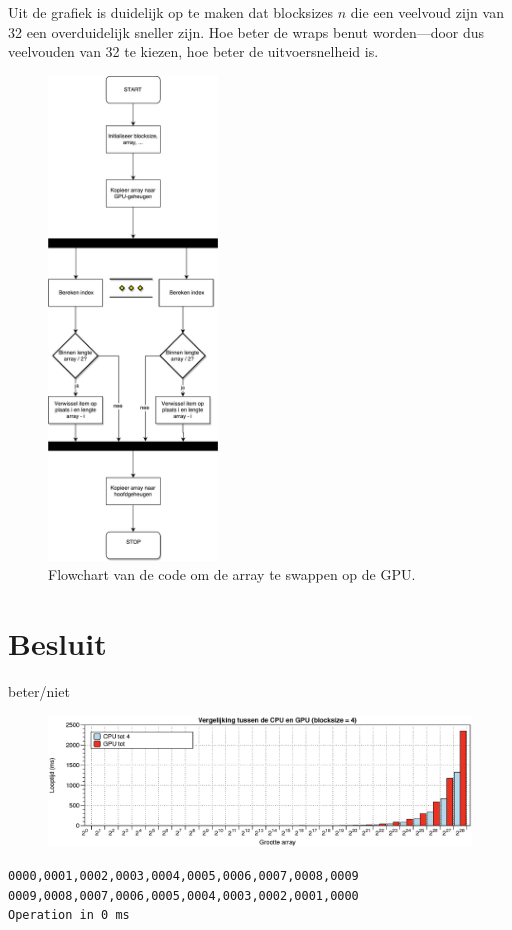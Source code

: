 \documentclass[10pt, twocolumn, a4paper]{article}
\begin{document}
Uit de grafiek is duidelijk op te maken dat blocksizes $n$ die een veelvoud zijn van 32 een overduidelijk sneller zijn. Hoe beter de wraps benut worden---door dus veelvouden van 32 te kiezen, hoe beter de uitvoersnelheid is.

\begin{figure}
\centering
\includegraphics[width=0.4\textwidth]{flowgraph.pdf}
\caption{Flowchart van de code om de array te swappen op de GPU.}
\end{figure}

\section{Besluit}
beter/niet

\begin{figure}
\includegraphics[width=\textwidth]{comp_4.eps}
\end{figure}



\begin{verbatim}
0000,0001,0002,0003,0004,0005,0006,0007,0008,0009 
0009,0008,0007,0006,0005,0004,0003,0002,0001,0000 
Operation in 0 ms
\end{verbatim}

\onecolumn

\appendix
\inputminted[tabsize=4,obeytabs]{c}{main.c}

\end{document}
